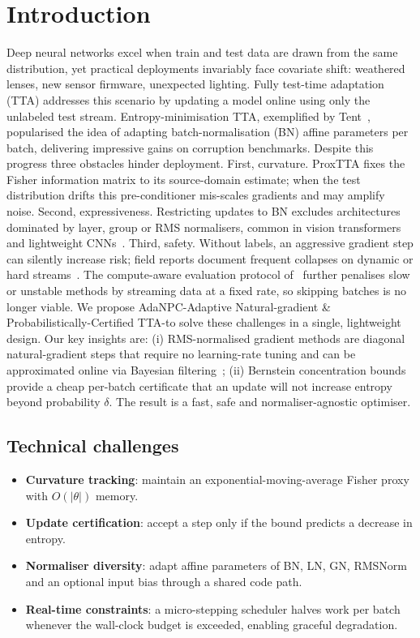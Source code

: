 \documentclass{article} %
\begin{document}
\section{Introduction}\label{sec:intro}
Deep neural networks excel when train and test data are drawn from the same distribution, yet practical deployments invariably face covariate shift: weathered lenses, new sensor firmware, unexpected lighting. Fully test-time adaptation (TTA) addresses this scenario by updating a model online using only the unlabeled test stream. Entropy-minimisation TTA, exemplified by Tent~\cite{wang-2020-tent}, popularised the idea of adapting batch-normalisation (BN) affine parameters per batch, delivering impressive gains on corruption benchmarks. Despite this progress three obstacles hinder deployment.
First, curvature. ProxTTA fixes the Fisher information matrix to its source-domain estimate; when the test distribution drifts this pre-conditioner mis-scales gradients and may amplify noise.
Second, expressiveness. Restricting updates to BN excludes architectures dominated by layer, group or RMS normalisers, common in vision transformers and lightweight CNNs~\cite{lim-2023-ttn}.
Third, safety. Without labels, an aggressive gradient step can silently increase risk; field reports document frequent collapses on dynamic or hard streams~\cite{niu-2023-towards,yuan-2023-robust}. The compute-aware evaluation protocol of~\cite{alfarra-2023-evaluation} further penalises slow or unstable methods by streaming data at a fixed rate, so skipping batches is no longer viable.
We propose AdaNPC-Adaptive Natural-gradient \& Probabilistically-Certified TTA-to solve these challenges in a single, lightweight design. Our key insights are: (i) RMS-normalised gradient methods are diagonal natural-gradient steps that require no learning-rate tuning and can be approximated online via Bayesian filtering~\cite{aitchison-2018-bayesian}; (ii) Bernstein concentration bounds provide a cheap per-batch certificate that an update will not increase entropy beyond probability \(\delta\). The result is a fast, safe and normaliser-agnostic optimiser.
\subsection{Technical challenges}
\begin{itemize}
  \item \textbf{Curvature tracking}: maintain an exponential-moving-average Fisher proxy with \(O(|\theta|)\) memory.
  \item \textbf{Update certification}: accept a step only if the bound predicts a decrease in entropy.
  \item \textbf{Normaliser diversity}: adapt affine parameters of BN, LN, GN, RMSNorm and an optional input bias through a shared code path.
  \item \textbf{Real-time constraints}: a micro-stepping scheduler halves work per batch whenever the wall-clock budget is exceeded, enabling graceful degradation.
\end{itemize}
\end{document}
